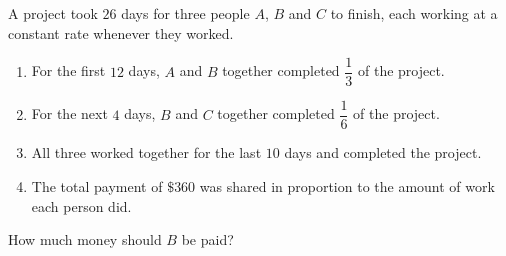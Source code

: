 A project took $26$ days for three people $A$, $B$ and $C$ to finish, each working at a constant rate whenever they worked.
\begin{enumerate}
\item For the first $12$ days, $A$ and $B$ together completed $\dfrac{1}{3}$ of the project.
\item For the next $4$ days, $B$ and $C$ together completed $\dfrac{1}{6}$ of the project.
\item All three worked together for the last $10$ days and completed the project.
\item The total payment of $\$360$ was shared in proportion to the amount of work each person did.
\end{enumerate}
How much money should $B$ be paid?
